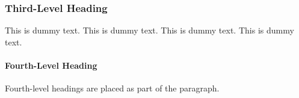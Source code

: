 \documentclass[letterpaper]{ar-1col}
\begin{document}
\subsubsection{Third-Level Heading}
This is dummy text. This is dummy text. This is dummy text. This is dummy text. 

\paragraph{Fourth-Level Heading} Fourth-level headings are placed as part of the paragraph.

% 
% 
% 
\end{document}

